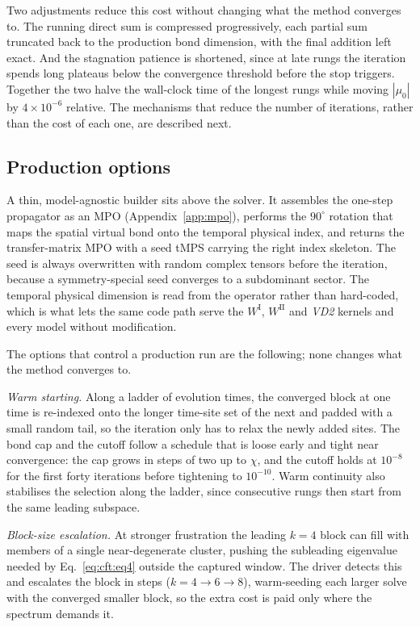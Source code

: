 Two adjustments reduce this cost without changing what the method converges to. The running direct sum is compressed progressively, each partial sum truncated back to the production bond dimension, with the final addition left exact. And the stagnation patience is shortened, since at late rungs the iteration spends long plateaus below the convergence threshold before the stop triggers. Together the two halve the wall-clock time of the longest rungs while moving $|\mu_0|$ by $4\times10^{-6}$ relative. The mechanisms that reduce the number of iterations, rather than the cost of each one, are described next.

\subsection{Production options}
\label{app:library:build}
\label{app:library:cluster}
\label{app:library:adaptive}

A thin, model-agnostic builder sits above the solver. It assembles the one-step propagator as an MPO (Appendix~\ref{app:mpo}), performs the $90^\circ$ rotation that maps the spatial virtual bond onto the temporal physical index, and returns the transfer-matrix MPO with a seed tMPS carrying the right index skeleton. The seed is always overwritten with random complex tensors before the iteration, because a symmetry-special seed converges to a subdominant sector. The temporal physical dimension is read from the operator rather than hard-coded, which is what lets the same code path serve the $W^{\mathrm{I}}$, $W^{\mathrm{II}}$ and \textit{VD2} kernels and every model without modification.

The options that control a production run are the following; none changes what the method converges to.

\textit{Warm starting.} Along a ladder of evolution times, the converged block at one time is re-indexed onto the longer time-site set of the next and padded with a small random tail, so the iteration only has to relax the newly added sites. The bond cap and the cutoff follow a schedule that is loose early and tight near convergence: the cap grows in steps of two up to $\chi$, and the cutoff holds at $10^{-8}$ for the first forty iterations before tightening to $10^{-10}$. Warm continuity also stabilises the selection along the ladder, since consecutive rungs then start from the same leading subspace.

\textit{Block-size escalation.} At stronger frustration the leading $k=4$ block can fill with members of a single near-degenerate cluster, pushing the subleading eigenvalue needed by Eq.~\eqref{eq:cft:eq4} outside the captured window. The driver detects this and escalates the block in steps ($k=4\to6\to8$), warm-seeding each larger solve with the converged smaller block, so the extra cost is paid only where the spectrum demands it.

